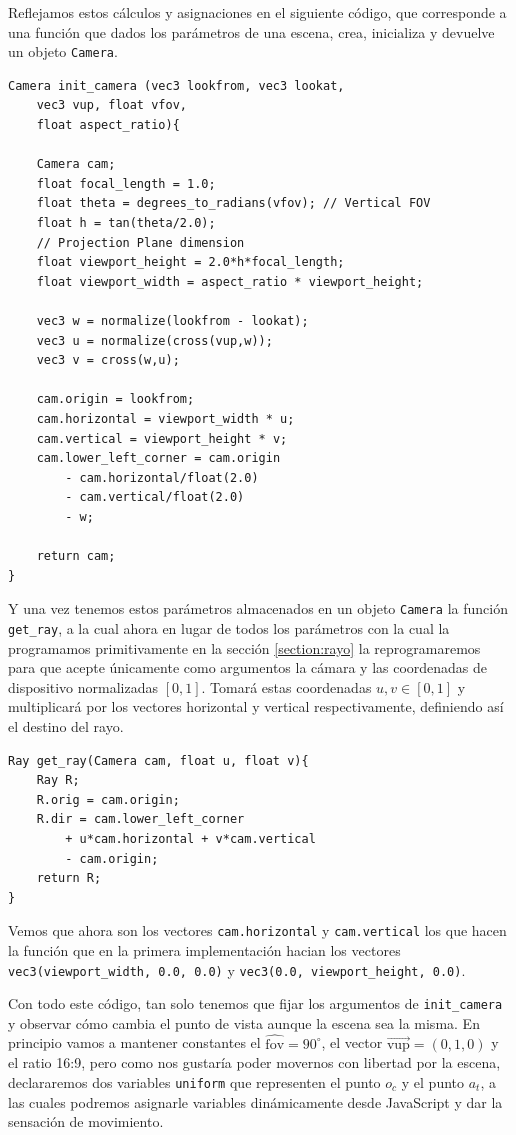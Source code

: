 Reflejamos estos cálculos y asignaciones en el siguiente código, que corresponde a una función que dados los parámetros de una escena, crea, inicializa y devuelve un objeto \verb|Camera|.
\begin{lstlisting}
Camera init_camera (vec3 lookfrom, vec3 lookat, 
    vec3 vup, float vfov, 
    float aspect_ratio){
    
    Camera cam;
    float focal_length = 1.0;
    float theta = degrees_to_radians(vfov); // Vertical FOV
    float h = tan(theta/2.0);
    // Projection Plane dimension
    float viewport_height = 2.0*h*focal_length;
    float viewport_width = aspect_ratio * viewport_height;

    vec3 w = normalize(lookfrom - lookat);
    vec3 u = normalize(cross(vup,w));
    vec3 v = cross(w,u);

    cam.origin = lookfrom;
    cam.horizontal = viewport_width * u;
    cam.vertical = viewport_height * v;
    cam.lower_left_corner = cam.origin 
        - cam.horizontal/float(2.0) 
        - cam.vertical/float(2.0)
        - w;

    return cam;
}
\end{lstlisting}

Y una vez tenemos estos parámetros almacenados en un objeto \verb|Camera| la función \verb|get_ray|, a la cual ahora en lugar de todos los parámetros con la cual la programamos primitivamente en la sección \ref{section:rayo} la reprogramaremos para que acepte únicamente como argumentos la cámara y las coordenadas de dispositivo normalizadas $[0,1]$. Tomará estas coordenadas $u,v\in[0,1]$ y multiplicará por los vectores horizontal y vertical respectivamente, definiendo así el destino del rayo.

\begin{lstlisting}
Ray get_ray(Camera cam, float u, float v){
    Ray R;
    R.orig = cam.origin;
    R.dir = cam.lower_left_corner 
        + u*cam.horizontal + v*cam.vertical 
        - cam.origin;
    return R;
}
\end{lstlisting}

Vemos que ahora son los vectores \verb|cam.horizontal| y \verb|cam.vertical| los que hacen la función que en la primera implementación hacian los vectores \verb|vec3(viewport_width, 0.0, 0.0)| y \verb|vec3(0.0, viewport_height, 0.0)|.

Con todo este código, tan solo tenemos que fijar los argumentos de \verb|init_camera| y observar cómo cambia el punto de vista aunque la escena sea la misma. En principio vamos a mantener constantes el $\widehat{\mathrm{fov}}=90^\circ$, el vector $\overrightarrow{\mathrm{vup}}=(0,1,0)$ y el ratio 16:9, pero como nos gustaría poder movernos con libertad por la escena, declararemos dos variables \verb|uniform| que representen el punto $o_c$ y el punto $a_t$, a las cuales podremos asignarle variables dinámicamente desde JavaScript y dar la sensación de movimiento.

